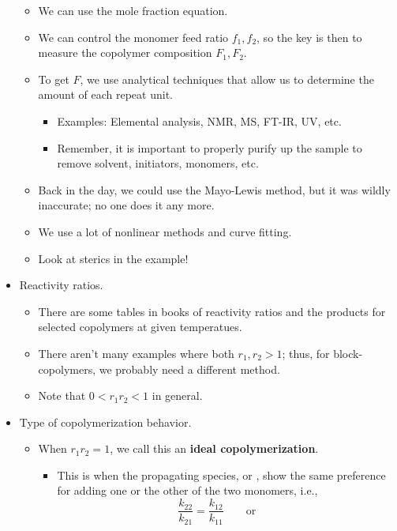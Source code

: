 \documentclass[../notes.tex]{subfiles}
\begin{document}
\begin{itemize}
    \begin{itemize}
        \item We can use the mole fraction equation.
        \item We can control the monomer feed ratio $f_1,f_2$, so the key is then to measure the copolymer composition $F_1,F_2$.
        \item To get $F$, we use analytical techniques that allow us to determine the amount of each repeat unit.
        \begin{itemize}
            \item Examples: Elemental analysis, NMR, MS, FT-IR, UV, etc.
            \item Remember, it is important to properly purify up the sample to remove solvent, initiators, monomers, etc.
        \end{itemize}
        \item Back in the day, we could use the Mayo-Lewis method, but it was wildly inaccurate; no one does it any more.
        \item We use a lot of nonlinear methods and curve fitting.
        \item Look at sterics in the example!
    \end{itemize}
    \item Reactivity ratios.
    \begin{itemize}
        \item There are some tables in books of reactivity ratios and the products for selected copolymers at given temperatues.
        \item There aren't many examples where both $r_1,r_2>1$; thus, for block-copolymers, we probably need a different method.
        \item Note that $0<r_1r_2<1$ in general.
    \end{itemize}
    \item Type of copolymerization behavior.
    \begin{itemize}
        \item When $r_1r_2=1$, we call this an \textbf{ideal copolymerization}.
        \begin{itemize}
            \item This is when the propagating species,  or , show the same preference for adding one or the other of the two monomers, i.e.,
            \begin{equation*}
                \frac{k_{22}}{k_{21}} = \frac{k_{12}}{k_{11}}
                \qquad\text{or}\qquad

\end{equation*}
\end{itemize}
\end{itemize}
\end{itemize}
\end{document}
